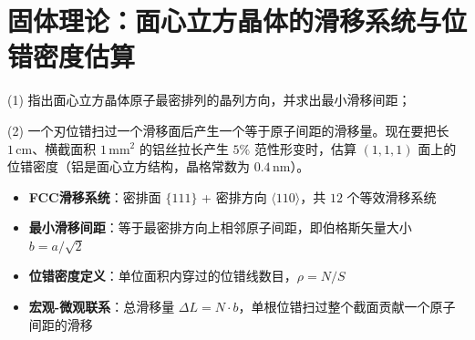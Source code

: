 \section{固体理论：面心立方晶体的滑移系统与位错密度估算}
\label{sec:fcc-slip-dislocation}

\begin{modelbox}[题目：FCC滑移系统与位错密度]
(1) 指出面心立方晶体原子最密排列的晶列方向，并求出最小滑移间距；

(2) 一个刃位错扫过一个滑移面后产生一个等于原子间距的滑移量。现在要把长 $1\,\mathrm{cm}$、横截面积 $1\,\mathrm{mm^2}$ 的铝丝拉长产生 $5\%$ 范性形变时，估算 $(1,1,1)$ 面上的位错密度（铝是面心立方结构，晶格常数为 $0.4\,\mathrm{nm}$）。
\end{modelbox}

\begin{tipbox}[考点快速分析]
\begin{itemize}
    \item \textbf{FCC滑移系统}：密排面 $\{111\}$ + 密排方向 $\langle 110\rangle$，共 $12$ 个等效滑移系统
    \item \textbf{最小滑移间距}：等于最密排方向上相邻原子间距，即伯格斯矢量大小 $b=a/\sqrt{2}$
    \item \textbf{位错密度定义}：单位面积内穿过的位错线数目，$\rho=N/S$
    \item \textbf{宏观-微观联系}：总滑移量 $\Delta L = N\cdot b$，单根位错扫过整个截面贡献一个原子间距的滑移
\end{itemize}
\end{tipbox}

